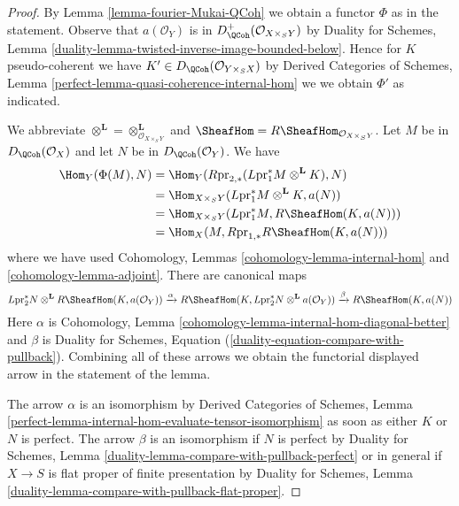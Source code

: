 \begin{proof}
By Lemma \ref{lemma-fourier-Mukai-QCoh} we obtain a functor $\Phi$
as in the statement. Observe that $a(\mathcal{O}_Y)$ is in
$D^+_\QCoh(\mathcal{O}_{X \times_S Y})$ by Duality for Schemes,
Lemma \ref{duality-lemma-twisted-inverse-image-bounded-below}.
Hence for $K$ pseudo-coherent we have
$K' \in D_\QCoh(\mathcal{O}_{Y \times_S X})$
by Derived Categories of Schemes, Lemma
\ref{perfect-lemma-quasi-coherence-internal-hom}
we we obtain $\Phi'$ as indicated.

\medskip\noindent
We abbreviate
$\otimes^\mathbf{L} = \otimes_{\mathcal{O}_{X \times_S Y}}^\mathbf{L}$
and
$\SheafHom = R\SheafHom_{\mathcal{O}_{X \times_S Y}}$.
Let $M$ be in $D_\QCoh(\mathcal{O}_X)$ and let
$N$ be in $D_\QCoh(\mathcal{O}_Y)$. We have
\begin{align*}
\Hom_Y(\Phi(M), N)
& =
\Hom_Y(R\text{pr}_{2, *}(L\text{pr}_1^*M \otimes^\mathbf{L} K), N) \\
& =
\Hom_{X \times_S Y}(L\text{pr}_1^*M \otimes^\mathbf{L} K, a(N)) \\
& =
\Hom_{X \times_S Y}(L\text{pr}_1^*M,
R\SheafHom(K, a(N))) \\
& =
\Hom_X(M, R\text{pr}_{1, *}R\SheafHom(K, a(N)))
\end{align*}
where we have used Cohomology, Lemmas \ref{cohomology-lemma-internal-hom}
and \ref{cohomology-lemma-adjoint}. There are canonical maps
$$
L\text{pr}_2^*N \otimes^\mathbf{L} R\SheafHom(K, a(\mathcal{O}_Y))
\xrightarrow{\alpha}
R\SheafHom(K, L\text{pr}_2^*N \otimes^\mathbf{L} a(\mathcal{O}_Y))
\xrightarrow{\beta}
R\SheafHom(K, a(N))
$$
Here $\alpha$ is
Cohomology, Lemma \ref{cohomology-lemma-internal-hom-diagonal-better}
and $\beta$ is Duality for Schemes, Equation
(\ref{duality-equation-compare-with-pullback}).
Combining all of these arrows we obtain the functorial displayed
arrow in the statement of the lemma.

\medskip\noindent
The arrow $\alpha$ is an isomorphism by
Derived Categories of Schemes, Lemma
\ref{perfect-lemma-internal-hom-evaluate-tensor-isomorphism}
as soon as either $K$ or $N$ is perfect.
The arrow $\beta$ is an isomorphism if $N$ is perfect by
Duality for Schemes, Lemma \ref{duality-lemma-compare-with-pullback-perfect}
or in general if $X \to S$ is
flat proper of finite presentation by
Duality for Schemes, Lemma
\ref{duality-lemma-compare-with-pullback-flat-proper}.
\end{proof}

